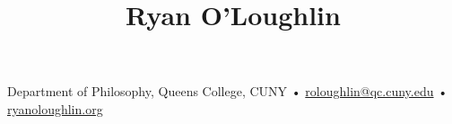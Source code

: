 \title{Ryan O’Loughlin}

{\small
Department of Philosophy, Queens College, CUNY \quad • \quad
\href{mailto:roloughlin@qc.cuny.edu}{roloughlin@qc.cuny.edu} \quad • \quad
\href{https://www.ryanoloughlin.org}{ryanoloughlin.org}
\par}
\vspace{1.0ex}
